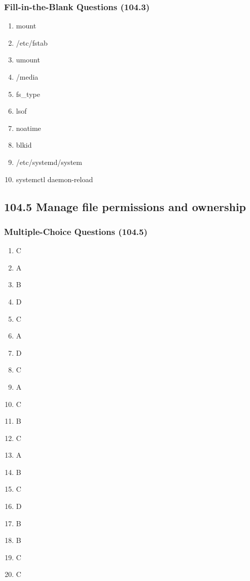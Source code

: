 \documentclass[a4paper]{report}
\begin{document}
\subsubsection*{Fill-in-the-Blank Questions (104.3)}
\begin{enumerate}[1.]
    \item mount
    \item /etc/fstab
    \item umount
    \item /media
    \item fs\_type
    \item lsof
    \item noatime
    \item blkid
    \item /etc/systemd/system
    \item systemctl daemon-reload
\end{enumerate}

\subsection*{104.5 Manage file permissions and ownership}
\subsubsection*{Multiple-Choice Questions (104.5)}
\begin{enumerate}[1.]
    \item C
    \item A
    \item B
    \item D
    \item C
    \item A
    \item D
    \item C
    \item A
    \item C
    \item B
    \item C
    \item A
    \item B
    \item C
    \item D
    \item B
    \item B
    \item C
    \item C
\end{enumerate}
\end{document}
